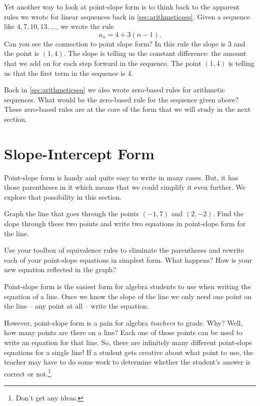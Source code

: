 Yet another way to look at point-slope form is to think back to the apparent rules we wrote for linear sequences back in \cref{sec:arithmeticseq}. Given a sequence like $4, 7, 10, 13,\dotsc$, we wrote the rule \[a_n = 4 + 3 (n-1).\] Can you see the connection to point slope form? In this rule the slope is 3 and the point is $(1,4)$. The slope is telling us the constant difference: the amount that we add on for each step forward in the sequence. The point $(1,4)$ is telling us that the first term in the sequence is 4.

Back in \cref{sec:arithmeticseq} we also wrote zero-based rules for arithmetic sequences. What would be the zero-based rule for the sequence given above? These zero-based rules are at the core of the form that we will study in the next section.

\section{Slope-Intercept Form}
\label{sec:slopeinterceptform}

Point-slope form is handy and quite easy to write in many cases. But, it has those parentheses in it which means that we could simplify it even further. We explore that possibility in this section.


\begin{boxedexplore}
Graph the line that goes through the points $(-1, 7)$ and $(2, -2)$. Find the slope through these two points and write two equations in point-slope form for the line.

Use your toolbox of equivalence rules to eliminate the parentheses and rewrite each of your point-slope equations in simplest form. What happens? How is your new equation reflected in the graph?
\end{boxedexplore} %

Point-slope form is the easiest form for algebra students to use when writing the equation of a line. Once we know the slope of the line we only need one point on the line -- any point at all -- write the equation.

However, point-slope form is a pain for algebra \textit{teachers} to grade. Why? Well, how many points are there on a line? Each one of those points can be used to write an equation for that line. So, there are infinitely many different point-slope equations for a single line! If a student gets creative about what point to use, the teacher may have to do some work to determine whether the student's answer is correct or not.\footnote{Don't get any ideas.}

